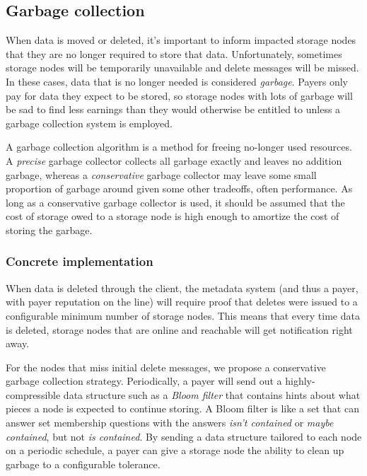 \documentclass[a4paper,10pt]{article} \usepackage[utf8]{inputenc}
\begin{document}
\subsection{Garbage collection}

When data is moved or deleted, it's important to inform impacted storage nodes
that they are no longer required to store that data. Unfortunately, sometimes
storage nodes will be temporarily unavailable and delete messages will be
missed. In these cases, data that is no longer needed is considered
{\em garbage}. Payers only pay for data they expect to be stored, so storage
nodes with lots of garbage will be sad to find less earnings than they would
otherwise be entitled to unless a garbage collection system is employed.

A garbage collection algorithm is a method for freeing no-longer used resources.
A {\em precise} garbage collector collects all garbage exactly and
leaves no addition garbage, whereas a {\em conservative} garbage collector may
leave some small proportion of garbage around given some other tradeoffs, often
performance. As long as a conservative garbage collector is used, it should
be assumed that the cost of storage owed to a storage node is high enough
to amortize the cost of storing the garbage.

\subsubsection{Concrete implementation}

When data is deleted through the client, the metadata system (and thus a payer,
with payer reputation on the line) will require proof that deletes were issued
to a configurable minimum number of storage nodes. This means that every time
data is deleted, storage nodes that are online and reachable will get
notification right away.

For the nodes that miss initial delete messages, we propose a conservative
garbage collection strategy. Periodically,
a payer will send out a highly-compressible data structure such as a
{\em Bloom filter} \cite{bloom-filter} that contains hints about what pieces
a node is expected to continue storing. A Bloom filter is like a set that can
answer set membership questions with the answers {\em isn't contained} or
{\em maybe contained}, but not {\em is contained}. By sending a data
structure tailored to each node on a periodic schedule, a payer can give a
storage node the ability to clean up garbage to a configurable tolerance.
\end{document}
